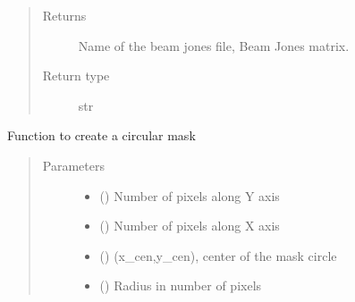 \documentclass[letterpaper,10pt,english]{sphinxmanual}
\begin{document}
\begin{fulllineitems}
\begin{fulllineitems}
\begin{quote}
\begin{description}
\item[{Returns}] \leavevmode
\sphinxAtStartPar
Name of the beam jones file, Beam Jones matrix.

\item[{Return type}] \leavevmode
\sphinxAtStartPar
str

\end{description}\end{quote}

\end{fulllineitems}


\begin{fulllineitems}
\label{\detokenize{paircars:paircars.fullpol_selfcal_LTS.PolSelfcal.create_circular_mask}}
\sphinxAtStartPar
Function to create a circular mask
\begin{quote}\begin{description}
\item[{Parameters}] \leavevmode\begin{itemize}
\item {} 
\sphinxAtStartPar
{} () \textendash{} Number of pixels along Y axis

\item {} 
\sphinxAtStartPar
{} () \textendash{} Number of pixels along X axis

\item {} 
\sphinxAtStartPar
{} () \textendash{} (x\_cen,y\_cen), center of the mask circle

\item {} 
\sphinxAtStartPar
{} () \textendash{} Radius in number of pixels

\end{itemize}


\end{description}
\end{quote}
\end{fulllineitems}
\end{fulllineitems}
\end{document}
